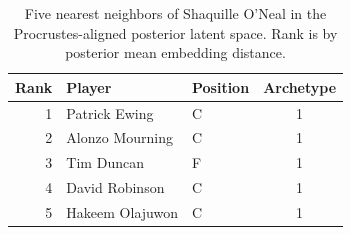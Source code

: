 \begin{table}[htbp]
  \centering\small
  \begin{tabular}{rllc}
    \toprule
    Rank & Player & Position & Archetype \\
    \midrule
    1 & Patrick Ewing & C & 1 \\
    2 & Alonzo Mourning & C & 1 \\
    3 & Tim Duncan & F & 1 \\
    4 & David Robinson & C & 1 \\
    5 & Hakeem Olajuwon & C & 1 \\
    \bottomrule
  \end{tabular}
  \caption{Five nearest neighbors of Shaquille O'Neal in the Procrustes-aligned posterior latent space. Rank is by posterior mean embedding distance.}
  \label{tab:Shaquille_O_Neal_neighbors}
\end{table}

